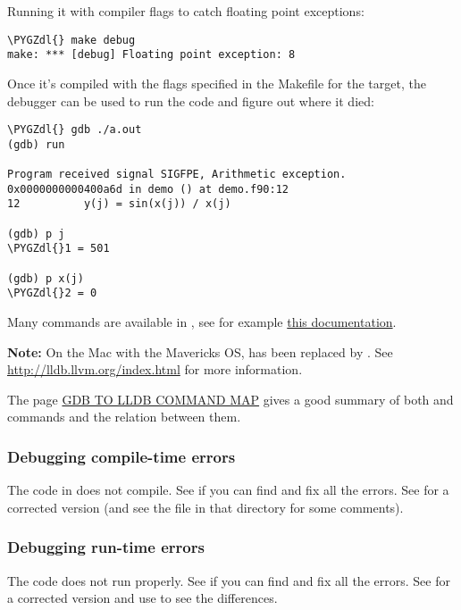 \documentclass[letterpaper,10pt,english]{sphinxmanual}
\def\PYGZdl{\char`\$}
\begin{document}
Running it with compiler flags to catch floating point exceptions:

\begin{Verbatim}[commandchars=\\\{\}]
\PYGZdl{} make debug
make: *** [debug] Floating point exception: 8
\end{Verbatim}

Once it's compiled with the flags specified in the Makefile for the 
target, the debugger  can be used to run
the code and figure out where it died:

\begin{Verbatim}[commandchars=\\\{\}]
\PYGZdl{} gdb ./a.out
(gdb) run

Program received signal SIGFPE, Arithmetic exception.
0x0000000000400a6d in demo () at demo.f90:12
12          y(j) = sin(x(j)) / x(j)

(gdb) p j
\PYGZdl{}1 = 501

(gdb) p x(j)
\PYGZdl{}2 = 0
\end{Verbatim}

Many commands are available in , see for example
\href{http://www.sourceware.org/gdb/current/onlinedocs/gdb.html}{this documentation}.

\textbf{Note:} On the Mac with the Mavericks OS,  has been replaced by
.  See \url{http://lldb.llvm.org/index.html} for more information.

The page \href{http://lldb.llvm.org/lldb-gdb.html}{GDB TO LLDB COMMAND MAP}
gives a good summary of both  and  commands and the relation
between them.


\subsubsection{Debugging compile-time errors}
\label{labs/lab8:debugging-compile-time-errors}
The code in  does not compile.  See if you can
find and fix all the errors.  See 
for a corrected version (and see the  file in that directory for
some comments).


\subsubsection{Debugging run-time errors}
\label{labs/lab8:debugging-run-time-errors}
The code  does not run properly.
See if you can find and fix all the errors.  See
 for a corrected version and use
 to see the differences.
\end{document}
